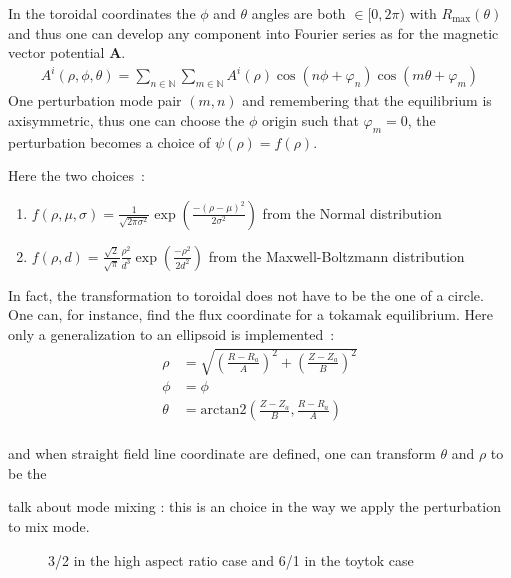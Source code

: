 In the toroidal coordinates the $\phi$ and $\theta$ angles are both $\in [0, 2\pi)$ with $R_\text{max}(\theta)$ and thus one can develop any component into Fourier series as for the magnetic vector potential $\textbf{A}$.
\begin{align*}
    A^i(\rho,\phi,\theta) = \sum\limits_{n\in\mathbb{N}}\sum\limits_{m\in\mathbb{N}} A^i(\rho)\cos(n\phi + \varphi_n)\cos(m\theta + \varphi_m)
\end{align*}
One perturbation mode pair $(m,n)$ and remembering that the equilibrium is axisymmetric, thus one can choose the $\phi$ origin such that $\varphi_m = 0$, the perturbation becomes a choice of $\psi(\rho) = f(\rho)$.

Here the two choices~:

\begin{enumerate}
    \item $f(\rho, \mu, \sigma) = \frac{1}{\sqrt{2\pi\sigma^2}}\exp\left(\frac{-(\rho-\mu)^2}{2\sigma^2}\right)$ from the Normal distribution
    
    \item $f(\rho, d) = \frac{\sqrt{2}}{\sqrt{\pi}}\frac{\rho^2}{d^3}\exp\left(\frac{-\rho^2}{2d^2}\right)$ from the Maxwell-Boltzmann distribution
\end{enumerate}

In fact, the transformation to toroidal does not have to be the one of a circle. One can, for instance, find the flux coordinate for a tokamak equilibrium. Here only a generalization to an ellipsoid is implemented~:
\begin{align*}
    \rho &= \sqrt{\left(\frac{R-R_a}{A}\right)^2 + \left(\frac{Z-Z_a}{B}\right)^2}\\
    \phi &= \phi\\
    \theta &= \text{arctan2}(\frac{Z-Z_a}{B}, \frac{R-R_a}{A})\\
\end{align*}

and when straight field line coordinate are defined, one can transform $\theta$ and $\rho$ to be the 


talk about mode mixing : this is an choice in the way we apply the perturbation to mix mode.


\begin{figure}[h!]
    \hfill
    \caption{3/2 in the high aspect ratio case and 6/1 in the toytok case}
\end{figure}

